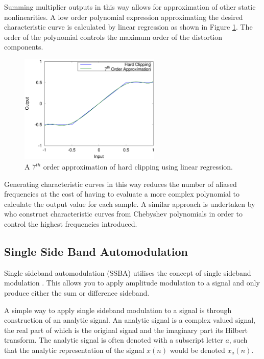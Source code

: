 			Summing multiplier outputs in this way allows for approximation of other static
			nonlinearities. A low order polynomial expression approximating the desired characteristic curve
			is calculated by linear regression as shown in Figure \ref{fig:ClippingApproximation}. The
			order of the polynomial controls the maximum order of the distortion components.

			\begin{figure}[h!]
				\centering
				\includegraphics[width=0.6\textwidth]{chapter3/Images/ClippingApproximation.eps}
				\caption{A $7^{th}$ order approximation of hard clipping using linear regression.}
				\label{fig:ClippingApproximation}
			\end{figure}

			Generating characteristic curves in this way reduces the number of aliased frequencies at the cost
			of having to evaluate a more complex polynomial to calculate the output value for each sample. A
			similar approach is undertaken by \cite{fernandez-cid2001distortion} who construct characteristic
			curves from Chebyshev polynomials in order to control the highest frequencies introduced.


	\subsection{Single Side Band Automodulation}
	\label{sec:Excitation-SSB}
		Single sideband automodulation (SSBA) utilises the concept of single sideband modulation
		\citep{corinthios2009signals}. This allows you to apply amplitude modulation to a signal and only produce
		either the sum or difference sideband.

		A simple way to apply single sideband modulation to a signal is through construction of an analytic signal.
		An analytic signal is a complex valued signal, the real part of which is the original signal and the
		imaginary part its Hilbert transform. The analytic signal is often denoted with a subscript letter
		$a$, such that the analytic representation of the signal $x(n)$ would be denoted $x_{a}(n)$.


